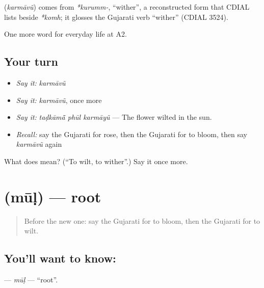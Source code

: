 \begin{cousinweb}
\textbf{} (\emph{karmāvũ}) comes from \emph{*kurumm-}, \textquotedblleft{}wither\textquotedblright{}, a reconstructed form that CDIAL lists beside \emph{*komh}; it glosses the Gujarati verb \textquotedblleft{}wither\textquotedblright{} (CDIAL 3524).
\end{cousinweb}

\begin{grammarlens}[title={What you've built}]
One more word for everyday life at A2.
\end{grammarlens}

\subsection*{Your turn}
\begin{itemize}
\raggedright
  \item \emph{Say it:} \emph{karmāvũ}
  \item \emph{Say it:} \emph{karmāvũ}, once more
  \item \emph{Say it:} \emph{taḍkāmā̃ phūl karmāyũ} — The flower wilted in the sun.
  \item \emph{Recall:} say the Gujarati for rose, then the Gujarati for to bloom, then say \emph{karmāvũ} again
\end{itemize}

\begin{tcolorbox}[breakable,colback=teal!4,colframe=teal!35!black,title={Before you move on}]
What does  mean? (\textquotedblleft{}To wilt, to wither\textquotedblright{}.) Say it once more.
\end{tcolorbox}
\section[\texorpdfstring{\gu{મૂળ} (mūḷ)}{મૂળ (mūḷ)}]{ (mūḷ) — root}

\label{lesson:GU-C241-mul}



\begin{quote}
Before the new one: say the Gujarati for to bloom, then the Gujarati for to wilt.
\end{quote}

\subsection*{You'll want to know: }
\textbf{} — \emph{mūḷ} — \textquotedblleft{}root\textquotedblright{}.

